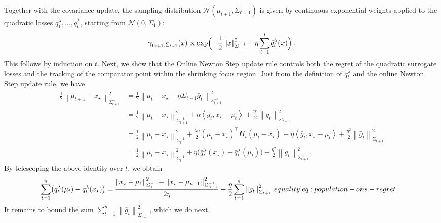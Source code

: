 \documentclass[12pt,cleveref]{jmlr}
\newcommand{\eqlabel}[1]{\label[equality]{#1}}
\newcommand{\N}{\mathcal N}
\newcommand{\1}{\mathbf 1}
\newcommand{\ip}[2]{\left\langle #1,#2\right\rangle}
\newcommand{\norm}[1]{\left\lVert #1\right\rVert}
\newcommand{\normm}[2]{\left\lVert #1\right\rVert_{#2}}
\begin{document}
Together with the covariance update, the sampling distribution $\N(\mu_{t+1},\Sigma_{t+1})$ is given by continuous exponential weights applied to the quadratic losses $\bar q_1^\lambda,\ldots,\bar q_t^\lambda$, starting from $\N(0,\Sigma_1)$:
\begin{align}
    \gamma_{\mu_{t+1},\Sigma_{t+1}}(x) \propto \exp\Bigl(-\frac12\normm{x}{\Sigma_1^{-1}}^2-\eta \sum_{i=1}^t \bar q_i^\lambda(x)\Bigr)\,.
\end{align}
This follows by induction on $t$.
Next, we show that the Online Newton Step update rule controls both the regret of the quadratic surrogate losses and the tracking of the comparator point within the shrinking focus region.
Just from the definition of $\bar{q}_t^\lambda$ and the online Newton Step update rule, we have
\begin{align}
    \frac12\normm{\mu_{t+1}-x_\star}{\Sigma_{t+1}^{-1}}^2
    & =\frac12\normm{\mu_t-x_\star-\eta\Sigma_{t+1}\bar g_t}
    {\Sigma_{t+1}^{-1}}^2                                                        \\
    & =\frac12\normm{\mu_t-x_\star}{\Sigma_{t+1}^{-1}}^2
    +\eta\ip{\bar g_t}{x_\star-\mu_t}
    +\frac{\eta^2}{2}\normm{\bar g_t}{\Sigma_{t+1}}^2                            \\
    & =\frac12\normm{\mu_t-x_\star}{\Sigma_t^{-1}}^2
    +\frac{\lambda\eta}{2}(\mu_t-x_\star)^\top \bar H_t (\mu_t-x_\star)
    +\eta\ip{\bar g_t}{x_\star-\mu_t}
    +\frac{\eta^2}{2}\normm{\bar g_t}{\Sigma_{t+1}}^2                            \\
    & =\frac12\normm{\mu_t-x_\star}{\Sigma_t^{-1}}^2
    +\eta\bigl(\bar q_t^\lambda(x_\star)-\bar q_t^\lambda(\mu_t)\bigr)
    +\frac{\eta^2}{2}\normm{\bar g_t}{\Sigma_{t+1}}^2.
\end{align}
By telescoping the above identity over $t$, we obtain
\begin{align}
    \sum_{t=1}^n
    \bigl(\bar{q}_t^\lambda(\mu_t) - \bar{q}_t^\lambda(x_\star)\bigr)
    & =
    \frac{\norm{x_\star - \mu_1}_{\Sigma_1^{-1}}^2 - \norm{x_\star - \mu_{n+1}}_{\Sigma_{n+1}^{-1}}^2}{2\eta}
    +\frac\eta2\sum_{t=1}^n\normm{\bar g_t}{\Sigma_{t+1}}^2.
    \eqlabel{eq:population-ons-regret}
\end{align}
It remains to bound the sum $\sum_{t=1}^n\normm{\bar g_t}{\Sigma_{t+1}}^2$, which we do next.
\end{document}
